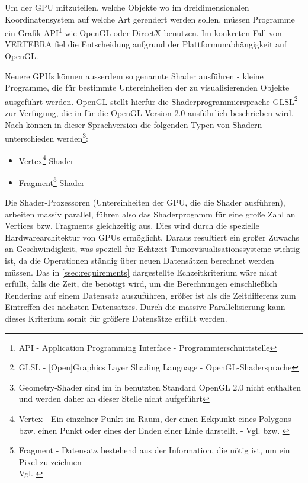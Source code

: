 \documentclass[a4paper,titlepage,12pt]{scrartcl}
\begin{document}
Um der GPU mitzuteilen, welche Objekte wo im dreidimensionalen Koordinatensystem auf welche Art gerendert werden sollen, müssen Programme ein Grafik-API\footnote{API - Application Programming Interface - Programmierschnittstelle} wie OpenGL oder DirectX benutzen. Im konkreten Fall von VERTEBRA fiel die Entscheidung aufgrund der Plattformunabhängigkeit auf OpenGL.

Neuere GPUs können ausserdem so genannte Shader ausführen - kleine Programme, die für bestimmte Untereinheiten der zu visualisierenden Objekte ausgeführt werden. OpenGL stellt hierfür die Shaderprogrammiersprache GLSL\footnote{GLSL - [Open]Graphics Layer Shading Language - OpenGL-Shadersprache} zur Verfügung, die in \cite{Rost2006} für die OpenGL-Version 2.0 ausführlich beschrieben wird. Nach \cite[Seite 38-47]{Rost2006} können in dieser Sprachversion die folgenden Typen von Shadern unterschieden werden\footnote{Geometry-Shader sind im in \cite{Rost2006} benutzten Standard OpenGL 2.0 nicht enthalten und werden daher an dieser Stelle nicht aufgeführt}:
\begin{itemize}
 \item Vertex\footnote{Vertex - Ein einzelner Punkt im Raum, der einen Eckpunkt eines Polygons bzw. einen Punkt oder eines der Enden einer Linie darstellt. - Vgl. \cite[Seite 664]{Wright2000} bzw. \cite[Seite 685]{Rost2006}}-Shader
 \item Fragment\footnote{Fragment - Datensatz bestehend aus der Information, die nötig ist, um ein Pixel zu zeichnen\\Vgl. \cite[Seite 675]{Rost2006}}-Shader
\end{itemize}
Die Shader-Prozessoren (Untereinheiten der GPU, die die Shader ausführen), arbeiten massiv parallel, führen also das Shaderprogamm für eine große Zahl an Vertices bzw. Fragments gleichzeitig aus. Dies wird durch die spezielle Hardwarearchitektur von GPUs ermöglicht. Daraus resultiert ein großer Zuwachs an Geschwindigkeit, was speziell für Echtzeit-Tumorvisualisationssysteme wichtig ist, da die Operationen ständig über neuen Datensätzen berechnet werden müssen. Das in \vref{ssec:requirements} dargestellte Echzeitkriterium wäre nicht erfüllt, falls die Zeit, die benötigt wird, um die Berechnungen einschließlich Rendering auf einem Datensatz auszuführen, größer ist als die Zeitdifferenz zum Eintreffen des nächsten Datensatzes. Durch die massive Parallelisierung kann dieses Kriterium somit für größere Datensätze erfüllt werden.
\end{document}
